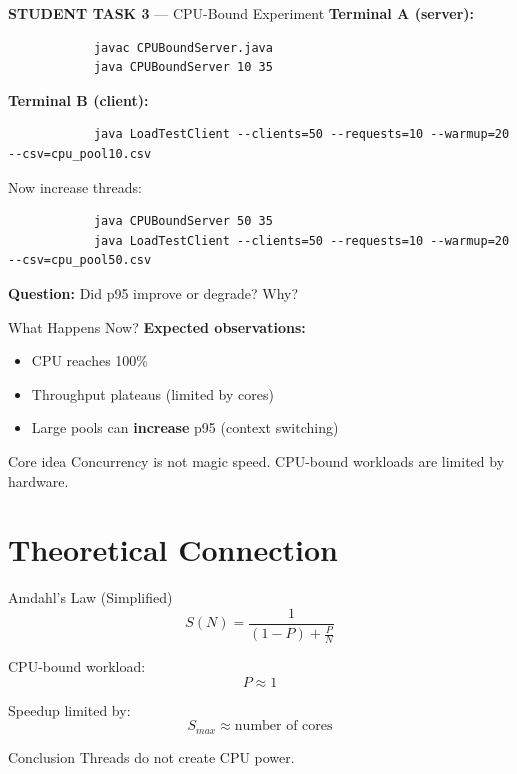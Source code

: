 \documentclass[11pt]{beamer}
\begin{document}
	\begin{frame}[fragile]{\textbf{STUDENT TASK 3} --- CPU-Bound Experiment}
		\textbf{Terminal A (server):}
		\begin{lstlisting}
			javac CPUBoundServer.java
			java CPUBoundServer 10 35
		\end{lstlisting}

		
		\textbf{Terminal B (client):}
		\begin{lstlisting}
			java LoadTestClient --clients=50 --requests=10 --warmup=20 --csv=cpu_pool10.csv
		\end{lstlisting}
		
		\pause
		
		Now increase threads:
		\begin{lstlisting}
			java CPUBoundServer 50 35
			java LoadTestClient --clients=50 --requests=10 --warmup=20 --csv=cpu_pool50.csv
		\end{lstlisting}

		
		\textbf{Question:} Did p95 improve or degrade? Why?
	\end{frame}
	
	\begin{frame}{What Happens Now?}
		\textbf{Expected observations:}
		\begin{itemize}
			\item CPU reaches 100\%
			\item Throughput plateaus (limited by cores)
			\item Large pools can \textbf{increase} p95 (context switching)
		\end{itemize}

		
		\begin{alertblock}{Core idea}
			Concurrency is not magic speed.
			CPU-bound workloads are limited by hardware.
		\end{alertblock}
	\end{frame}
	
	\section{Theoretical Connection}
	
	\begin{frame}{Amdahl's Law (Simplified)}
		\[
		S(N) = \frac{1}{(1 - P) + \frac{P}{N}}
		\]
		
		CPU-bound workload:
		\[
		P \approx 1
		\]
		

		Speedup limited by:
		\[
		S_{max} \approx \text{number of cores}
		\]
		

		\begin{block}{Conclusion}
			Threads do not create CPU power.
		\end{block}
	\end{frame}
	
\end{document}
